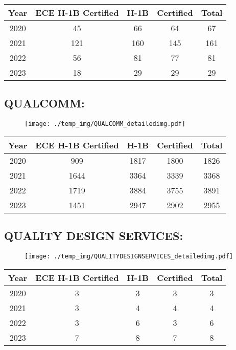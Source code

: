\documentclass{article}%
\begin{document}
%
\begin{longtable}{c|c|c|c|c}%
\hline%
Year&ECE H{-}1B Certified&H{-}1B&Certified&Total\\%
\hline%
2020&45&66&64&67\\%
\hline%
2021&121&160&145&161\\%
\hline%
2022&56&81&77&81\\%
\hline%
2023&18&29&29&29\\%
\hline%
\end{longtable}

%
\newpage%
\subsection{QUALCOMM:}%
\label{subsec:QUALCOMM}%
\label{QUALCOMMdetailed}%


\begin{figure}[htbp]%
\centering%
\texttt{[image: ./temp\_img/QUALCOMM\_detailedimg.pdf]}%
\end{figure}

%
\begin{longtable}{c|c|c|c|c}%
\hline%
Year&ECE H{-}1B Certified&H{-}1B&Certified&Total\\%
\hline%
2020&909&1817&1800&1826\\%
\hline%
2021&1644&3364&3339&3368\\%
\hline%
2022&1719&3884&3755&3891\\%
\hline%
2023&1451&2947&2902&2955\\%
\hline%
\end{longtable}

%
\newpage%
\subsection{QUALITY DESIGN SERVICES:}%
\label{subsec:QUALITYDESIGNSERVICES}%
\label{QUALITYDESIGNSERVICESdetailed}%


\begin{figure}[htbp]%
\centering%
\texttt{[image: ./temp\_img/QUALITYDESIGNSERVICES\_detailedimg.pdf]}%
\end{figure}

%
\begin{longtable}{c|c|c|c|c}%
\hline%
Year&ECE H{-}1B Certified&H{-}1B&Certified&Total\\%
\hline%
2020&3&3&3&3\\%
\hline%
2021&3&4&4&4\\%
\hline%
2022&3&6&3&6\\%
\hline%
2023&7&8&7&8\\%
\hline%
\end{longtable}
\end{document}
